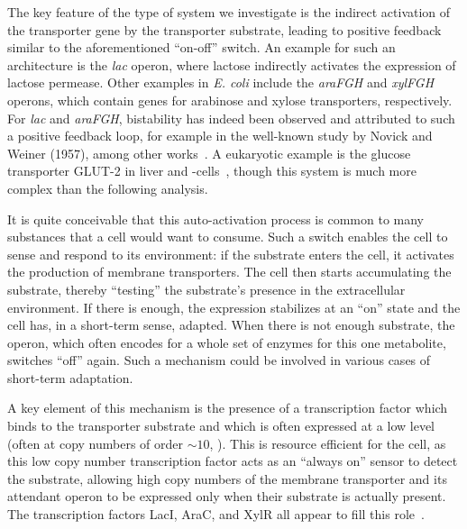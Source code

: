 \documentclass[10pt,letterpaper]{article}
\begin{document}
	The key feature of the type of system we investigate is the indirect activation of
	the transporter gene by the transporter substrate, leading to positive
	feedback similar to the aforementioned ``on-off'' switch. An example for
	such an architecture is the \emph{lac} operon, where lactose indirectly
	activates the expression of lactose permease. Other examples in \emph{E.
		coli} include the \emph{araFGH} and \emph{xylFGH} operons, which contain genes for
	arabinose and xylose transporters, respectively. For \emph{lac} and
	\emph{araFGH}, bistability has indeed been observed and attributed to such a
	positive feedback
	loop, for example in the well-known study by Novick and Weiner (1957),
	among other works~\cite{Novick1957,Santillan2008,Ozbudak2004,Narang2008,Choi2008,Fritz2014,Jenkins2017,Siegele1997}.
	A eukaryotic example is the glucose transporter GLUT-2 in liver and
	\textbeta-cells~\cite{Bae2010,Tiedge1991}, though this system is much more
	complex than the following analysis.
	
	It is quite conceivable that this auto-activation process is common to many
	substances that a cell would want to consume. Such a switch enables the
	cell to sense and respond to its environment: if the substrate enters the
	cell, it activates the production of membrane transporters. The cell then
	starts accumulating the substrate, thereby ``testing'' the substrate's
	presence in the extracellular environment. If there is enough, the
	expression stabilizes at an ``on'' state and the cell has, in a short-term
	sense, adapted. When there is not enough substrate, the operon, which
	often encodes for a whole set of enzymes for this one metabolite, switches
	``off'' again. Such a mechanism could be involved in various cases of
	short-term adaptation.
	
	A key element of this mechanism is the presence of a transcription factor
	which binds to the transporter substrate and which is often expressed at a low level (often at copy numbers
	of order $\sim10$, \cite{Schmidt2015, Li2014}).
	This is resource efficient for the cell, as this low copy number
	transcription factor acts as an ``always on'' sensor to detect
	the substrate, allowing high copy numbers of the membrane transporter
	and its attendant operon to be expressed only when
	their substrate is actually present. The transcription factors
	LacI, AraC, and XylR all appear to fill this
	role~\cite{Novick1957,Santillan2008,Ozbudak2004,Narang2008,Choi2008,Fritz2014,Jenkins2017,Siegele1997,Song1997,Schmidt2015}.
	
\end{document}
